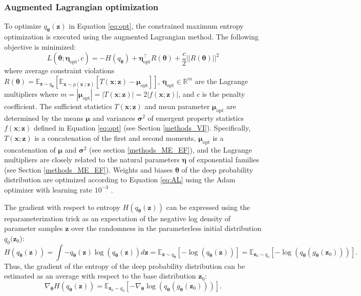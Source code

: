 \documentclass[11pt]{article}
\begin{document}
\subsubsection{Augmented Lagrangian optimization}\label{methods_AL_opt}
To optimize $q_{\bm{\theta}}(\mathbf{z})$ in Equation \ref{eq:opt}, the constrained maximum entropy optimization is executed using the augmented Lagrangian method.  
The following objective is minimized:
\begin{equation} \label{eq:AL}
L(\bm{\theta}; \bm{\eta}_{\text{opt}}, c) = -H(q_{\bm{\theta}}) + \bm{\eta}_{\text{opt}}^\top R(\bm{\theta}) + \frac{c}{2}||R(\bm{\theta})||^2
\end{equation}
where average constraint violations $R(\bm{\theta}) = \mathbb{E}_{\mathbf{z} \sim q_{\bm{\theta}}}\left[ \mathbb{E}_{\mathbf{x}\sim p(\mathbf{x} \mid \mathbf{z})}\left[T(\mathbf{x}; \mathbf{z}) - \bm{\mu}_{\text{opt}} \right] \right]$, $\bm{\eta}_{\text{opt}} \in \mathbb{R}^m$ are the Lagrange multipliers where $m = |\bm{\mu}_{\text{opt}}| = |T(\mathbf{x}; \mathbf{z})| = 2|f(\mathbf{x}; \mathbf{z})|$,  and $c$ is the penalty coefficient. 
The sufficient statistics $T(\mathbf{x}; \mathbf{z})$ and mean parameter $\bm{\mu}_{\text{opt}}$ are determined by the means $\bm{\mu}$ and variances $\bm{\sigma}^2$ of emergent property statistics $f(\mathbf{x}; \mathbf{z})$ defined in Equation \ref{eq:opt} (see Section \ref{methods_VI}).
Specifically, $T(\mathbf{x}; \mathbf{z})$ is a concatenation of the first and second moments, $\bm{\mu}_{\text{opt}}$ is a concatenation of $\bm{\mu}$ and $\bm{\sigma}^2$ (see section \ref{methods_ME_EF}), and the Lagrange multipliers are closely related to the natural parameters $\bm{\eta}$ of exponential families (see Section \ref{methods_ME_EF}).
Weights and biases $\bm{\theta}$ of the deep probability distribution are optimized according to Equation \ref{eq:AL} using the Adam optimizer with learning rate $10^{-3}$ \cite{kingma2014adam}.

The gradient with respect to entropy $H(q_{\bm{\theta}}(\mathbf{z}))$ can be expressed using the reparameterization trick as an expectation of the negative log density of parameter samples $\mathbf{z}$ over the randomness in the parameterless initial distribution $q_0(\mathbf{z}_0$):
\begin{equation}
H(q_{\bm{\theta}}(\mathbf{z})) = \int - q_{\bm{\theta}}(\mathbf{z}) \log(q_{\bm{\theta}}(\mathbf{z})) d\mathbf{z} = \mathbb{E}_{\mathbf{z} \sim q_{\bm{\theta}}}\left[-\log(q_{\bm{\theta}}(\mathbf{z})) \right] = \mathbb{E}_{\mathbf{z}_0 \sim q_0}\left[-\log(q_{\bm{\theta}}(g_{\bm{\theta}}(\mathbf{z}_0))) \right].
\end{equation}
Thus, the gradient of the entropy of the deep probability distribution can be estimated as an average with respect to the base distribution $\mathbf{z}_0$:
\begin{equation}
\nabla_{\bm{\theta}} H(q_{\bm{\theta}}(\mathbf{z})) = \mathbb{E}_{\mathbf{z}_0 \sim q_0}\left[- \nabla_{\bm{\theta}} \log(q_{\bm{\theta}}(g_{\bm{\theta}}(\mathbf{z}_0))) \right].
\end{equation}
\end{document}
